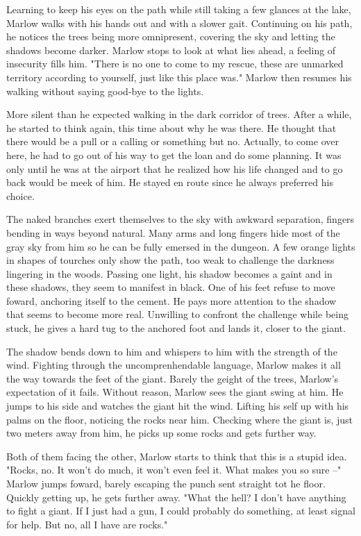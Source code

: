 		Learning to keep his eyes on the path while still taking a few glances at the lake, Marlow walks with his hands out and with a slower gait. Continuing
	on his path, he notices the trees being more omnipresent, covering the sky and letting the shadows become darker. Marlow stops to look at what lies ahead, a
	feeling of insecurity fills him. "There is no one to come to my rescue, these are unmarked territory according to yourself, just like this place was." Marlow
	then resumes his walking without saying good-bye to the lights.

		More silent than he expected walking in the dark corridor of trees. After a while, he started to think again, this time about why he was there. He 
	thought that there would be a pull or a calling or something but no. Actually, to come over here, he had to go out of his way to get the loan and do some
	planning. It was only until he was at the airport that he realized how his life changed and to go back would be meek of him. He stayed en route since he
	always preferred his choice.

		The naked branches exert themselves to the sky with awkward separation, fingers bending in ways beyond natural. Many arms and long fingers hide most
	of the gray sky from him so he can be fully emersed in the dungeon. A few orange lights in shapes of tourches only show the path, too weak to challenge the
	darkness lingering in the woods. Passing one light, his shadow becomes a gaint and in these shadows, they seem to manifest in black. One of his feet refuse
	to move foward, anchoring itself to the cement. He pays more attention to the shadow that seems to become more real. Unwilling to confront the challenge 
	while being stuck, he gives a hard tug to the anchored foot and lands it, closer to the giant.

		The shadow bends down to him and whispers to him with the strength of the wind. Fighting through the uncomprenhendable language, Marlow makes it all
	the way towards the feet of the giant. Barely the geight of the trees, Marlow's expectation of it fails. Without reason, Marlow sees the giant swing at him.
	He jumps to his side and watches the giant hit the wind. Lifting his self up with his palms on the floor, noticing the rocks near him. Checking where the giant
	is, just two meters away from him, he picks up some rocks and gets further way.

		Both of them facing the other, Marlow starts to think that this is a stupid idea. "Rocks, no. It won't do much, it won't even feel it. What makes you
	so sure --" Marlow jumps foward, barely escaping the punch sent straight tot he floor. Quickly getting up, he gets further away. "What the hell? I don't
	have anything to fight a giant. If I just had a gun, I could probably do something, at least signal for help. But no, all I have are rocks."

